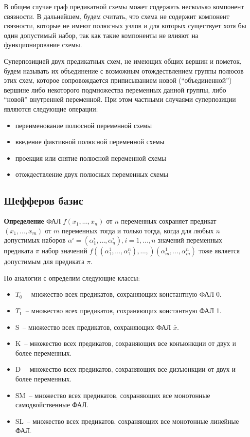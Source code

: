 \documentclass[12pt]{article}
\begin{document}
В общем случае граф предикатной схемы может содержать несколько компонент связности. 
В дальнейшем, будем считать, что схема не содержит компонент связности, 
которые не имеют полюсных узлов и для которых существует хотя бы один допустимый набор, так как такие компоненты не влияют на функционирование схемы.

Суперпозицией двух предикатных схем, не имеющих общих вершин и пометок, 
будем называть их объединение с возможным отождествлением группы полюсов этих схем, 
которое сопровождается приписыванием новой (``объединенной'') вершине либо 
некоторого подмножества переменных данной группы, либо ``новой'' внутренней переменной.
 При этом частными случаями суперпозиции являются следующие операции:
\begin{itemize}
\item переименование полюсной переменной схемы

\item введение фиктивной полюсной переменной схемы

\item проекция или снятие полюсной переменной схемы

\item отождествление двух полюсных переменных схемы
\end{itemize}

\subsection{Шефферов базис}

\textbf{Определение} ФАЛ
$f (x_1, \ldots, x_n)$ от $n$ переменных сохраняет предикат $ (x_1, \ldots, x_m)$ от $m$
переменных тогда и только тогда, когда для любых $n$ допустимых наборов $\alpha^i = (\alpha_1^i, \ldots, \alpha_n^i), 
i = 1, \ldots, n$ значений переменных предиката $\pi$ набор
значений $f((\alpha_1^1, \ldots, \alpha_1^n), \ldots, )(\alpha_m^1, \ldots, \alpha_m^n)$
тоже является допустимым для предиката $\pi$.

По аналогии с \cite{Shu11} определим следующие классы:
\begin{itemize}
    \item{$T_0$}~-- множество всех предикатов, сохраняющих константную ФАЛ 0.
    \item{$T_1$}~-- множество всех предикатов, сохраняющих константную ФАЛ 1.
    \item{S}~-- множество всех предикатов, сохраняющих ФАЛ $\bar{x}$.
    \item{K}~-- множество всех предикатов, сохраняющих все конъюнкции от двух и более переменных.
    \item{D}~-- множество всех предикатов, сохраняющих все дизъюнкции от двух и более переменных.
    \item{SM}~-- множество всех предикатов, сохраняющих все монотонные самодвойственные ФАЛ.
    \item{SL}~-- множество всех предикатов, сохраняющих все монотонные линейные ФАЛ.
\end{itemize}
\end{document}
